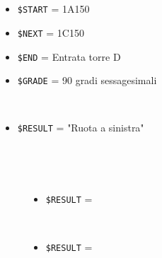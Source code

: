 \documentclass[../../SperimentazioniPratiche.tex]{subfiles}
\begin{document}
			\paragraph*{}
			\label{2Prova16B.1}
			\begin{tcolorbox}[fonttitle=\bfseries, 
								adjusted title={\Large Prova 16B.1}, 
								breakable, 
								sharp corners=south,
								colback=white, 
								colframe=white!60!black]
				
				\begin{description}[leftmargin=0.7cm,labelwidth=!]
				
					\item[Input] \ \par 
        				\begin{itemize}
        					\item \verb|$START| = 1A150
							\item \verb|$NEXT| = 1C150
							\item \verb|$END| = Entrata torre D
        					\item \verb|$GRADE| = 90 gradi sessagesimali
        				\end{itemize}
        				
        			\tcbline 
        				
        			\item[Output atteso] \ \par
        				\begin{itemize}
        					\item \verb|$RESULT| = "Ruota a sinistra"
        				\end{itemize}

					\tcbline        				
        				
        			\item[Output riscontrato] \ \par
        				\begin{description}
        				
        					\item[\dispositivoA] \ \par
        					\begin{itemize}
        						\item \verb|$RESULT| = \ok
        					\end{itemize}      					
        					
        					\item[\dispositivoB] \ \par
        					\begin{itemize}
        						\item \verb|$RESULT| = \ok
        					\end{itemize}
        					

\end{description}
\end{description}
\end{tcolorbox}
\end{document}
